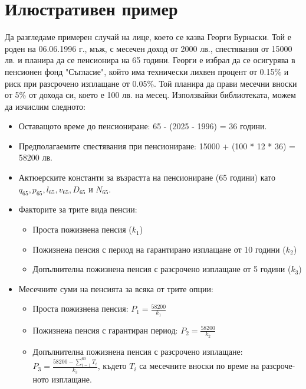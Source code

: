 \documentclass[a4paper,12pt]{article}
\begin{document}
\section{Илюстративен пример}
Да разгледаме примерен случай на лице, което се казва Георги Бурнаски. Той е роден на 06.06.1996 г., мъж, с месечен доход от 2000 лв., спестявания от 15000 лв. и планира да се пенсионира на 65 години.
\newline
Георги е избрал да се осигурява в пенсионен фонд "Съгласие", който има технически лихвен процент от 0.15\% и риск при разсрочено изплащане от 0.05\%. Той планира да прави месечни вноски от 5\% от дохода си, което е 100 лв. на месец.
\newline
\newline
Използвайки библиотеката, можем да изчислим следното:
\begin{itemize}
        \item Оставащото време до пенсиониране: 65 - (2025 - 1996) = 36 години.
        \item Предполагаемите спестявания при пенсиониране: 15000 + (100 * 12 * 36) = 58200 лв.
        \item Актюерските константи за възрастта на пенсиониране (65 години) като $q_{65}, p_{65}, l_{65}, v_{65}, D_{65}$ и $N_{65}$.
        \item Факторите за трите вида пенсии:
              \begin{itemize}
                      \item Проста пожизнена пенсия ($k_1$)
                      \item Пожизнена пенсия с период на гарантирано изплащане от 10 години ($k_2$)
                      \item Допълнителна пожизнена пенсия с разсрочено изплащане от 5 години ($k_3$)
              \end{itemize}
        \item Месечните суми на пенсията за всяка от трите опции:
              \begin{itemize}
                      \item Проста пожизнена пенсия: $P_1 = \frac{
                                            58200}{k_1}$
                      \item Пожизнена пенсия с гарантиран период: $P_2 = \frac{
                                            58200}{k_2}$
                      \item Допълнителна пожизнена пенсия с разсрочено изплащане: $P_3 = \frac{
                                            58200 - \sum_{i=1}^{60} T_i}{k_3}$, където $T_i$ са месечните вноски по време на разсроче- ното изплащане.
              \end{itemize}
\end{itemize}
\end{document}

